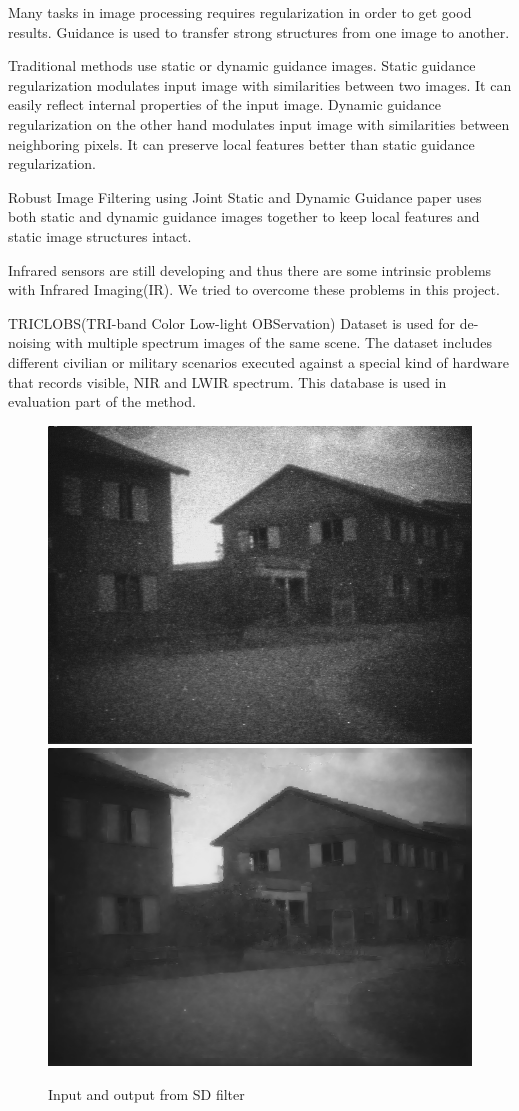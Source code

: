 \documentclass[10pt,twocolumn,letterpaper]{article}
\begin{document}
	Many tasks in image processing requires regularization in order to get good results. Guidance is used to transfer strong structures from one image to another. 
	
	Traditional methods use static or dynamic guidance images. Static guidance regularization modulates input image with similarities between two images. It can easily reflect internal properties of the input image.
	Dynamic guidance regularization on the other hand modulates input image with similarities between neighboring pixels. It can preserve local features better than static guidance regularization.
	
	Robust Image Filtering using Joint Static and Dynamic Guidance\cite{ham2015robust} paper uses both static and dynamic guidance images together to keep local features and static image structures intact.
	
	Infrared sensors are still developing and thus there are some intrinsic problems with Infrared Imaging(IR). We tried to overcome these problems in this project.
	
	TRICLOBS(TRI-band Color Low-light OBServation) Dataset\cite{triclobs} is used for de-noising with multiple spectrum images of the same scene. The dataset includes different civilian or military scenarios executed against a special kind of hardware that records visible, NIR and LWIR spectrum. This database is used in evaluation part of the method\cite{ham2015robust}.
	
	\begin{figure}
		\includegraphics[width=0.49\columnwidth]{images/TRI_A4/ch1.png}
		\includegraphics[width=0.49\columnwidth]{images/TRI_A4/ch1_ch3_15_3000_150.png}
		\caption{Input and output from SD filter}\label{fig:example-input-output}
	\end{figure}
	
\end{document}
